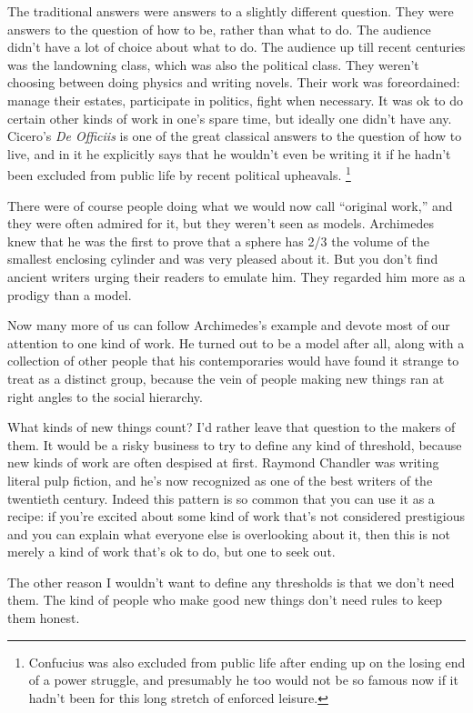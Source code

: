 The traditional answers were answers to a slightly different question.
They were answers to the question of how to be, rather than what to do.
The audience didn't have a lot of choice about what to do. The audience
up till recent centuries was the landowning class, which was also the
political class. They weren't choosing between doing physics and writing
novels. Their work was foreordained: manage their estates, participate
in politics, fight when necessary. It was ok to do certain other kinds
of work in one's spare time, but ideally one didn't have any. Cicero's
\emph{De Officiis} is one of the great classical answers to the question
of how to live, and in it he explicitly says that he wouldn't even be
writing it if he hadn't been excluded from public life by recent
political upheavals. \footnote{Confucius was also excluded from public life after ending up on
the losing end of a power struggle, and presumably he too would not be
so famous now if it hadn't been for this long stretch of enforced
leisure.}

There were of course people doing what we would now call ``original
work,'' and they were often admired for it, but they weren't seen as
models. Archimedes knew that he was the first to prove that a sphere has
2/3 the volume of the smallest enclosing cylinder and was very pleased
about it. But you don't find ancient writers urging their readers to
emulate him. They regarded him more as a prodigy than a model.

Now many more of us can follow Archimedes's example and devote most of
our attention to one kind of work. He turned out to be a model after
all, along with a collection of other people that his contemporaries
would have found it strange to treat as a distinct group, because the
vein of people making new things ran at right angles to the social
hierarchy.

What kinds of new things count? I'd rather leave that question to the
makers of them. It would be a risky business to try to define any kind
of threshold, because new kinds of work are often despised at first.
Raymond Chandler was writing literal pulp fiction, and he's now
recognized as one of the best writers of the twentieth century. Indeed
this pattern is so common that you can use it as a recipe: if you're
excited about some kind of work that's not considered prestigious and
you can explain what everyone else is overlooking about it, then this is
not merely a kind of work that's ok to do, but one to seek out.

The other reason I wouldn't want to define any thresholds is that we
don't need them. The kind of people who make good new things don't need
rules to keep them honest.

